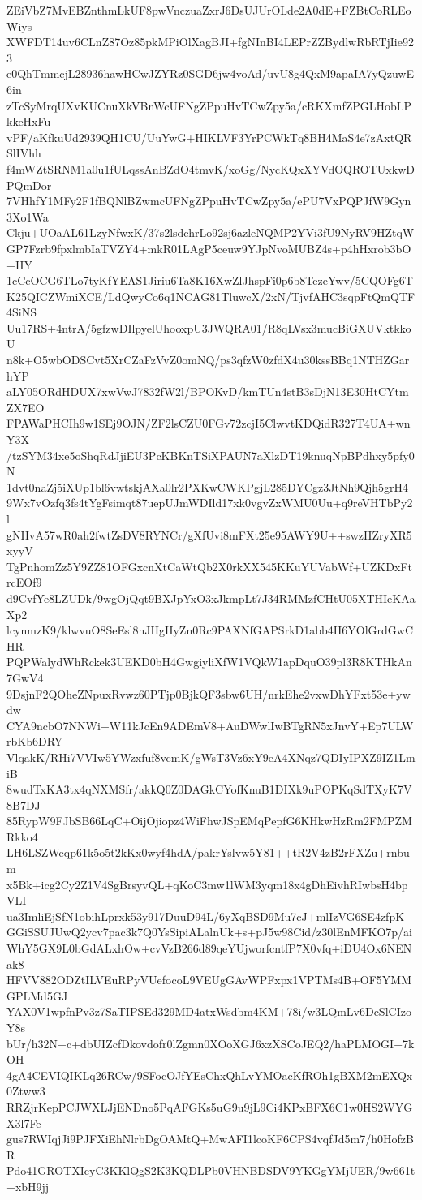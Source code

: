 ZEiVbZ7MvEBZnthmLkUF8pwVnczuaZxrJ6DsUJUrOLde2A0dE+FZBtCoRLEoWiys
XWFDT14uv6CLnZ87Oz85pkMPiOlXagBJI+fgNInBI4LEPrZZBydlwRbRTjIie923
e0QhTmmcjL28936hawHCwJZYRz0SGD6jw4voAd/uvU8g4QxM9apaIA7yQzuwE6in
zTcSyMrqUXvKUCnuXkVBnWcUFNgZPpuHvTCwZpy5a/cRKXmfZPGLHobLPkkeHxFu
vPF/aKfkuUd2939QH1CU/UuYwG+HIKLVF3YrPCWkTq8BH4MaS4e7zAxtQRSlIVhh
f4mWZtSRNM1a0u1fULqssAnBZdO4tmvK/xoGg/NycKQxXYVdOQROTUxkwDPQmDor
7VHhfY1MFy2F1fBQNlBZwmcUFNgZPpuHvTCwZpy5a/ePU7VxPQPJfW9Gyn3Xo1Wa
Ckju+UOaAL61LzyNfwxK/37s2lsdchrLo92sj6azleNQMP2YVi3fU9NyRV9HZtqW
GP7Fzrb9fpxlmbIaTVZY4+mkR01LAgP5ceuw9YJpNvoMUBZ4s+p4hHxrob3bO+HY
1cCcOCG6TLo7tyKfYEAS1Jiriu6Ta8K16XwZlJhspFi0p6b8TezeYwv/5CQOFg6T
K25QICZWmiXCE/LdQwyCo6q1NCAG81TluwcX/2xN/TjvfAHC3sqpFtQmQTF4SiNS
Uu17RS+4ntrA/5gfzwDIlpyelUhooxpU3JWQRA01/R8qLVsx3mucBiGXUVktkkoU
n8k+O5wbODSCvt5XrCZaFzVvZ0omNQ/ps3qfzW0zfdX4u30kssBBq1NTHZGarhYP
aLY05ORdHDUX7xwVwJ7832fW2l/BPOKvD/kmTUn4stB3sDjN13E30HtCYtmZX7EO
FPAWaPHCIh9w1SEj9OJN/ZF2lsCZU0FGv72zcjI5ClwvtKDQidR327T4UA+wnY3X
/tzSYM34xe5oShqRdJjiEU3PcKBKnTSiXPAUN7aXlzDT19knuqNpBPdhxy5pfy0N
1dvt0naZj5iXUp1bl6vwtskjAXa0lr2PXKwCWKPgjL285DYCgz3JtNh9Qjh5grH4
9Wx7vOzfq3fs4tYgFsimqt87uepUJmWDIld17xk0vgvZxWMU0Uu+q9reVHTbPy2l
gNHvA57wR0ah2fwtZsDV8RYNCr/gXfUvi8mFXt25e95AWY9U++swzHZryXR5xyyV
TgPnhomZz5Y9ZZ81OFGxcnXtCaWtQb2X0rkXX545KKuYUVabWf+UZKDxFtrcEOf9
d9CvfYe8LZUDk/9wgOjQqt9BXJpYxO3xJkmpLt7J34RMMzfCHtU05XTHIeKAaXp2
lcynmzK9/klwvuO8SeEsl8nJHgHyZn0Rc9PAXNfGAPSrkD1abb4H6YOlGrdGwCHR
PQPWalydWhRckek3UEKD0bH4GwgiyliXfW1VQkW1apDquO39pl3R8KTHkAn7GwV4
9DsjnF2QOheZNpuxRvwz60PTjp0BjkQF3sbw6UH/nrkEhe2vxwDhYFxt53e+ywdw
CYA9ncbO7NNWi+W11kJcEn9ADEmV8+AuDWwlIwBTgRN5xJnvY+Ep7ULWrbKb6DRY
VlqakK/RHi7VVIw5YWzxfuf8vcmK/gWsT3Vz6xY9eA4XNqz7QDIyIPXZ9IZ1LmiB
8wudTxKA3tx4qNXMSfr/akkQ0Z0DAGkCYofKnuB1DIXk9uPOPKqSdTXyK7V8B7DJ
85RypW9FJbSB66LqC+OijOjiopz4WiFhwJSpEMqPepfG6KHkwHzRm2FMPZMRkko4
LH6LSZWeqp61k5o5t2kKx0wyf4hdA/pakrYslvw5Y81++tR2V4zB2rFXZu+rnbum
x5Bk+icg2Cy2Z1V4SgBrsyvQL+qKoC3mw1lWM3yqm18x4gDhEivhRIwbsH4bpVLI
ua3ImliEjSfN1obihLprxk53y917DuuD94L/6yXqBSD9Mu7cJ+mlIzVG6SE4zfpK
GGiSSUJUwQ2ycv7pac3k7Q0YsSipiALalnUk+s+pJ5w98Cid/z30lEnMFKO7p/ai
WhY5GX9L0bGdALxhOw+cvVzB266d89qeYUjworfcntfP7X0vfq+iDU4Ox6NENak8
HFVV882ODZtILVEuRPyVUefocoL9VEUgGAvWPFxpx1VPTMs4B+OF5YMMGPLMd5GJ
YAX0V1wpfnPv3z7SaTIPSEd329MD4atxWsdbm4KM+78i/w3LQmLv6DcSlCIzoY8s
bUr/h32N+c+dbUIZcfDkovdofr0lZgmn0XOoXGJ6xzXSCoJEQ2/haPLMOGI+7kOH
4gA4CEVIQIKLq26RCw/9SFocOJfYEsChxQhLvYMOacKfROh1gBXM2mEXQx0Ztww3
RRZjrKepPCJWXLJjENDno5PqAFGKs5uG9u9jL9Ci4KPxBFX6C1w0HS2WYGX3l7Fe
gus7RWIqjJi9PJFXiEhNlrbDgOAMtQ+MwAFI1lcoKF6CPS4vqfJd5m7/h0HofzBR
Pdo41GROTXIcyC3KKlQgS2K3KQDLPb0VHNBDSDV9YKGgYMjUER/9w661t+xbH9jj
